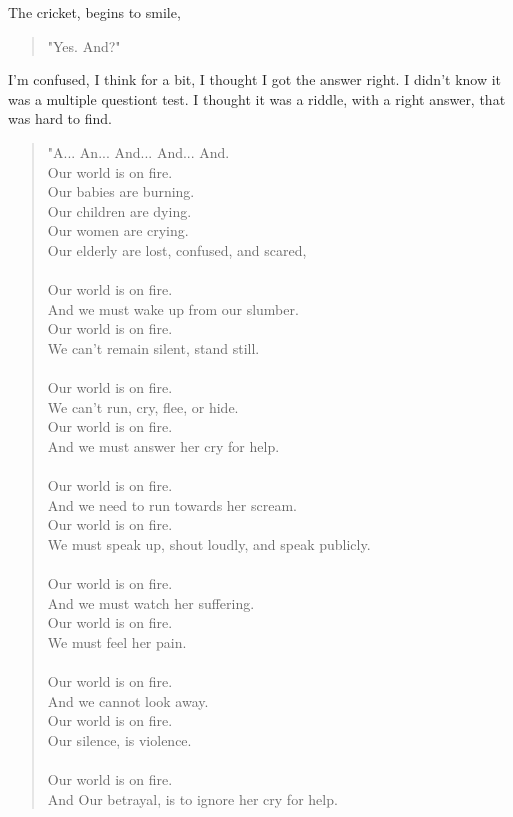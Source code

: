 \documentclass[16pt,openany,oneside]{book}
\begin{document}
The cricket, begins to smile, 
\begin{quote}
      "Yes. And?"
\end{quote}      
I'm confused, I think for a bit, I thought I got the answer right. I didn't know it was a multiple questiont test.
I thought it was a riddle, with a right answer, that was hard to find.
\begin{quote}
      "A... An... And... And... And. \\
       Our world is on fire. \\
       Our babies are burning. \\
       Our children are dying. \\
       Our women are crying. \\
       Our elderly are lost, confused, and scared,
       \\\\
       Our world is on fire. \\
       And we must wake up from our slumber. \\
       Our world is on fire. \\
       We can't remain silent, stand still.
       \\\\
       Our world is on fire. \\
       We can't run, cry, flee, or hide. \\
       Our world is on fire. \\
       And we must answer her cry for help. 
       \\\\
       Our world is on fire. \\
       And we need to run towards her scream. \\ 
       Our world is on fire. \\
       We must speak up, shout loudly, and speak publicly.
       \\\\
       Our world is on fire. \\
       And we must watch her suffering. \\
       Our world is on fire. \\
       We must feel her pain.
       \\\\
       Our world is on fire. \\
       And we cannot look away. \\
       Our world is on fire. \\
       Our silence, is violence.
       \\\\
       Our world is on fire.  \\
       And Our betrayal, is to ignore her cry for help.
\end{quote} 
\end{document}
